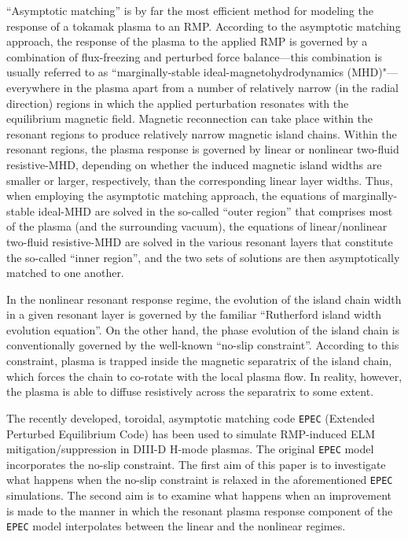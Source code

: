 \documentclass[12pt,prb,aps]{revtex4-1}
\begin{document}
``Asymptotic matching'' is by far the most efficient method for modeling the response of a tokamak plasma to an RMP.\cite{fkr,coppi,ruth,ara,pletz,rfa, am1,tokuda,brennan,am2,am3} 
According to the asymptotic matching approach, the response of the plasma to the applied RMP is governed by a combination of flux-freezing and
perturbed force balance---this combination is usually referred to as ``marginally-stable ideal-magnetohydrodynamics (MHD)"---everywhere in the plasma apart from a number of relatively narrow (in the radial direction) regions in which the applied
perturbation resonates with the equilibrium magnetic field. Magnetic reconnection can take place within the resonant regions to
produce relatively narrow magnetic island chains. Within the resonant regions, the plasma response is governed by  linear or nonlinear 
 two-fluid resistive-MHD, depending on whether the induced magnetic island widths are smaller or larger, respectively, than the corresponding linear layer widths. 
 Thus, when employing the asymptotic matching approach, the equations of marginally-stable ideal-MHD
are solved in the so-called ``outer region'' that comprises most of the plasma (and the surrounding vacuum), the equations of 
linear/nonlinear two-fluid resistive-MHD are solved in the various resonant layers that constitute the so-called ``inner region'', and the two
sets of solutions are then asymptotically matched to one another. 

In the nonlinear resonant response regime, the evolution of the island chain width in a given resonant layer is governed by the familiar ``Rutherford island width evolution equation''.\cite{ruth,ruth1}
On the other hand, the phase evolution of the island chain is conventionally governed by the well-known ``no-slip constraint''.\cite{rfa} According to this constraint,  plasma is trapped inside the
magnetic separatrix of the island chain,
which forces the chain to co-rotate with the local plasma flow. In reality, however, the plasma
is able to diffuse resistively across the separatrix to some extent.\cite{slip1,slip2} 

The recently developed, toroidal, asymptotic matching code {\tt EPEC} (Extended Perturbed Equilibrium Code) has been used to simulate 
RMP-induced ELM mitigation/suppression in DIII-D H-mode plasmas.\cite{rftor,rftor1}
The original {\tt EPEC} model incorporates the no-slip constraint.
The first aim of this paper is to investigate 
what happens when the no-slip constraint is relaxed in the aforementioned {\tt EPEC} simulations.
 The second aim is to examine what happens when an improvement is made to the manner in which the resonant
plasma response component of the {\tt EPEC} model interpolates between the linear and the nonlinear regimes. 
\end{document}
